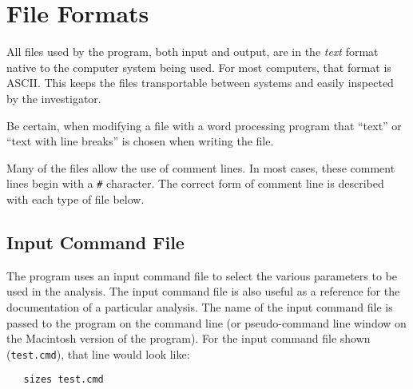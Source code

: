 \documentclass[letterpaper]{article}
\begin{document}
\section{File Formats}

All files used by the program, both input and output, 
are in the \emph{text} format native to the computer 
system being used.  For most computers, that format 
is ASCII.  This keeps the files transportable between 
systems and easily inspected by the investigator.

Be certain, when modifying a file with a word 
processing program that ``text'' or ``text with line 
breaks'' is chosen when writing the file.

Many of the files allow the use of comment lines.  In 
most cases, these comment lines begin with a \verb|#| 
character.  The correct form of comment line is 
described with each type of file below.

\subsection{Input Command File}

The program uses an input command file to select the 
various parameters to be used in the analysis.  The 
input command file is also useful as a reference for the 
documentation of a particular analysis.  The name of 
the input command file is passed to the program on 
the command line (or pseudo-command line window on 
the Macintosh version of the program).  For the input 
command file shown (\texttt{test.cmd}), that line 
would look like:
\begin{verbatim}
   sizes test.cmd
\end{verbatim}
\end{document}
